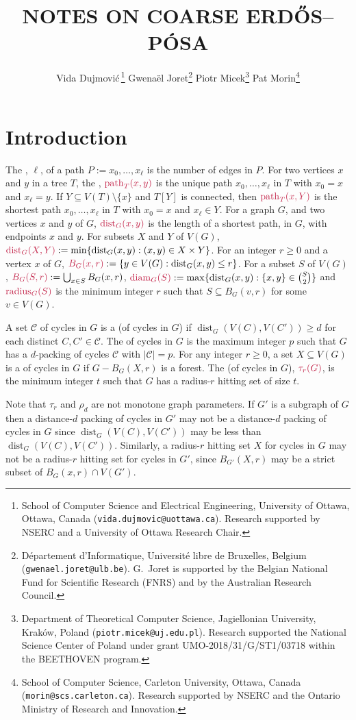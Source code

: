 \documentclass{patmorin}
\title{\MakeUppercase{Notes on Coarse {E}rdős–{P}ósa}}
\author{
 Vida Dujmovi{\'c}\,\footnote{School of Computer Science and Electrical Engineering, University of Ottawa, Ottawa, Canada (\texttt{vida.dujmovic@uottawa.ca}). Research supported by NSERC and a University of Ottawa Research Chair.}
 \qquad
 Gwena\"el Joret\footnote{D\'epartement d'Informatique, Universit\'e libre de Bruxelles, Belgium ({\tt gwenael.joret@ulb.be}). G.\ Joret is supported by the Belgian National Fund for Scientific Research (FNRS) and by the Australian Research Council.}
 \qquad
 Piotr Micek\footnote{Department of Theoretical Computer Science, Jagiellonian University, Kraków, Poland (\texttt{piotr.micek@uj.edu.pl}). Research supported
 the National Science Center of Poland under grant UMO-2018/31/G/ST1/03718 within the BEETHOVEN program.}
 \qquad
 Pat Morin\footnote{School of Computer Science, Carleton University, Ottawa, Canada (\texttt{morin@scs.carleton.ca}). Research supported by NSERC and the Ontario Ministry of Research and Innovation.}}
\date{}
\DeclareMathOperator{\diam}{diam}
\DeclareMathOperator{\radius}{radius}
\DeclareMathOperator{\pth}{path}
\DeclareMathOperator{\dist}{dist}
\begin{document}
\maketitle

\section{Introduction}

The , $\ell$, of a path $P:=x_0,\ldots,x_\ell$ is the number of edges in $P$.  For two vertices $x$ and $y$ in a  tree $T$, the , $\mathdefin{\pth_T(x,y)}$ is the unique path $x_0,\ldots,x_\ell$ in $T$ with $x_0=x$ and $x_\ell=y$. If $Y\subseteq V(T)\setminus\{x\}$ and $T[Y]$ is connected, then $\mathdefin{\pth_T(x,Y)}$ is the shortest path $x_0,\ldots,x_{\ell}$ in $T$ with $x_0=x$ and $x_\ell\in Y$.  For a graph $G$, and two vertices $x$ and $y$ of $G$, $\mathdefin{\dist_G(x,y)}$ is the length of a shortest path, in $G$, with endpoints $x$ and $y$.  For subsets $X$ and $Y$ of $V(G)$, $\mathdefin{\dist_G(X,Y)}:=\min\{\dist_G(x,y):(x,y)\in X\times Y\}$.  For an integer $r\ge 0$ and a vertex $x$ of $G$, $\mathdefin{B_G(x,r)}:=\{y\in V(G):\dist_G(x,y)\le r\}$.  For a subset $S$ of $V(G)$, $\mathdefin{B_G(S,r)}:=\bigcup_{x\in S}B_G(x,r)$, $\mathdefin{\diam_G(S)}:=\max\{\dist_G(x,y):\{x,y\}\in\binom{S}{2}\}$ and $\mathdefin{\radius_G(S)}$ is the minimum integer $r$ such that $S\subseteq B_G(v,r)$ for some $v\in V(G)$.

A set $\mathcal{C}$ of cycles in $G$ is a  (of cycles in $G$) if $\dist_G(V(C),V(C'))\ge d$ for each distinct $C,C'\in\mathcal{C}$.
The  of cycles in $G$ is the maximum integer $p$ such that $G$ has a $d$-packing of cycles $\mathcal{C}$ with $|\mathcal{C}|=p$.    For any integer $r\ge 0$, a set $X\subseteq V(G)$ is a  of cycles in $G$ if $G-B_G(X,r)$ is a forest.  The  (of cycles in $G$), $\mathdefin{\tau_r(G)}$, is the minimum integer $t$ such that $G$ has a radius-$r$ hitting set of size $t$.

Note that $\tau_r$ and $\rho_d$ are not monotone graph parameters.  If $G'$ is a subgraph of $G$ then a distance-$d$ packing of cycles in $G'$ may not be a distance-$d$ packing of cycles in $G$ since $\dist_{G}(V(C),V(C'))$ may be less than $\dist_G(V(C),V(C'))$.  Similarly, a radius-$r$ hitting set $X$ for cycles in $G$ may not be a radius-$r$ hitting set for cycles in $G'$, since $B_{G'}(X,r)$ may be a strict subset of $B_{G}(x,r)\cap V(G')$.
\end{document}
